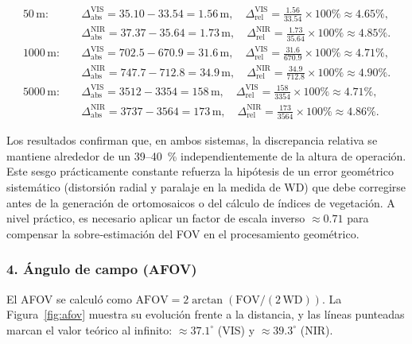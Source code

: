     \begin{align*}
    50\,\mathrm{m}:&\quad
    \Delta_{\mathrm{abs}}^{\mathrm{VIS}} = 35.10 - 33.54 = 1.56\,\mathrm{m}, 
    \quad
    \Delta_{\mathrm{rel}}^{\mathrm{VIS}} = \frac{1.56}{33.54}\times100\%\approx4.65\%,\\
    &\quad
    \Delta_{\mathrm{abs}}^{\mathrm{NIR}} = 37.37 - 35.64 = 1.73\,\mathrm{m}, 
    \quad
    \Delta_{\mathrm{rel}}^{\mathrm{NIR}} = \frac{1.73}{35.64}\times100\%\approx4.85\%.\\[6pt]
    1000\,\mathrm{m}:&\quad
    \Delta_{\mathrm{abs}}^{\mathrm{VIS}} = 702.5 - 670.9 = 31.6\,\mathrm{m}, 
    \quad
    \Delta_{\mathrm{rel}}^{\mathrm{VIS}} = \frac{31.6}{670.9}\times100\%\approx4.71\%,\\
    &\quad
    \Delta_{\mathrm{abs}}^{\mathrm{NIR}} = 747.7 - 712.8 = 34.9\,\mathrm{m}, 
    \quad
    \Delta_{\mathrm{rel}}^{\mathrm{NIR}} = \frac{34.9}{712.8}\times100\%\approx4.90\%.\\[6pt]
    5000\,\mathrm{m}:&\quad
    \Delta_{\mathrm{abs}}^{\mathrm{VIS}} = 3512 - 3354 = 158\,\mathrm{m}, 
    \quad
    \Delta_{\mathrm{rel}}^{\mathrm{VIS}} = \frac{158}{3354}\times100\%\approx4.71\%,\\
    &\quad
    \Delta_{\mathrm{abs}}^{\mathrm{NIR}} = 3737 - 3564 = 173\,\mathrm{m}, 
    \quad
    \Delta_{\mathrm{rel}}^{\mathrm{NIR}} = \frac{173}{3564}\times100\%\approx4.86\%.
    \end{align*}

    
    Los resultados confirman que, en ambos sistemas, la discrepancia relativa se mantiene alrededor de un 39–40 \% independientemente de la altura de operación. Este sesgo prácticamente constante refuerza la hipótesis de un error geométrico sistemático (distorsión radial y paralaje en la medida de WD) que debe corregirse antes de la generación de ortomosaicos o del cálculo de índices de vegetación. A nivel práctico, es necesario aplicar un factor de escala inverso \(\approx0.71\) para compensar la sobre‑estimación del FOV en el procesamiento geométrico.
    
    
    \subsubsection*{4. Ángulo de campo (AFOV)}
    El AFOV se calculó como
    \(\mathrm{AFOV}=2\arctan(\mathrm{FOV}/(2\,\mathrm{WD}))\).  
    La Figura \ref{fig:afov} muestra su evolución frente a la distancia,
    y las líneas punteadas marcan el valor teórico al infinito:
    \(\approx37.1^{\circ}\) (VIS) y \(\approx39.3^{\circ}\) (NIR).
    
